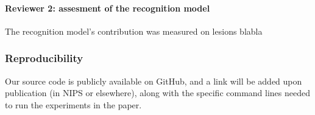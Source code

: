 \documentclass{article}
\begin{document}
\paragraph*{Reviewer 2: assesment of the recognition model} The recognition
model's contribution was measured on lesions blabla


\subsubsection*{Reproducibility}
Our source code is publicly available on GitHub,
and a link will be added upon publication (in NIPS or elsewhere),
along with the specific command lines  needed to run
the experiments in the paper.

\end{document}
